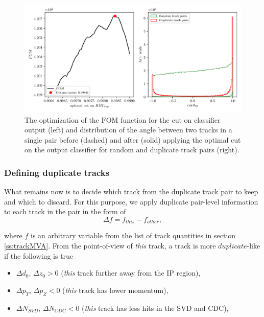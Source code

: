 \begin{figure}[!htb]
	\centering
	\captionsetup{width=0.8\linewidth}
	\includegraphics[width=\linewidth]{fig/ROECleanup_dup_opt}
	\caption{The optimization of the $\mathrm{FOM}$ function for the cut on classifier output (left) and distribution of the angle between two tracks in a single pair before (dashed) and after (solid) applying the optimal cut on the output classifier for random and duplicate track pairs (right).}
	\label{fig:ROE_dupOpt}
\end{figure}

\subsubsection{Defining duplicate tracks}

What remains now is to decide which track from the duplicate track pair to keep and which to discard. For this purpose, we apply duplicate pair-level information to each track in the pair in the form of
\begin{equation}
\Delta f = f_{this} - f_{other},
\end{equation}

where $f$ is an arbitrary variable from the list of track quantities in section \ref{ss:trackMVA}. From the point-of-view of \textit{this} track, a track is more $duplicate$-like if the following is true
\begin{itemize}
	\item $\Delta d_0,\,\Delta z_0 > 0$ (\textit{this} track further away from the IP region),
	\item $\Delta p_T,\,\Delta p_Z < 0$ (\textit{this} track has lower momentum),
	\item $\Delta N_{SVD},\,\Delta N_{CDC} < 0$ (\textit{this} track has less hits in the SVD and CDC),
\end{itemize}


